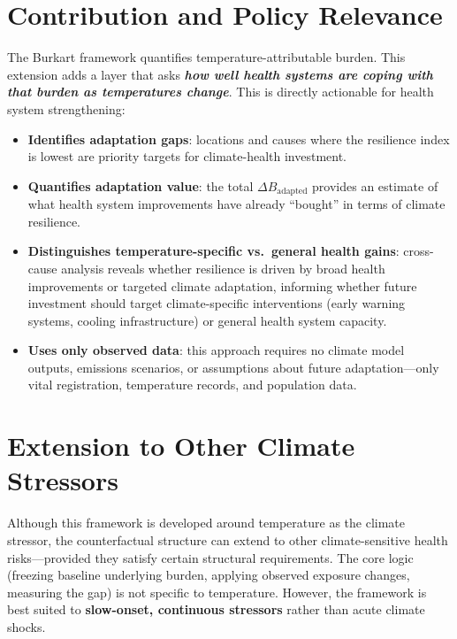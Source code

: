 \documentclass[11pt,a4paper]{article}
\begin{document}
\section{Contribution and Policy Relevance}

The Burkart framework quantifies temperature-attributable burden. This extension adds a layer that asks \textbf{\emph{how well health systems are coping with that burden as temperatures change}}. This is directly actionable for health system strengthening:

\begin{itemize}[nosep]
  \item \textbf{Identifies adaptation gaps}: locations and causes where the resilience index is lowest are priority targets for climate-health investment.
  \item \textbf{Quantifies adaptation value}: the total $\Delta B_{\text{adapted}}$ provides an estimate of what health system improvements have already ``bought'' in terms of climate resilience.
  \item \textbf{Distinguishes temperature-specific vs.\ general health gains}: cross-cause analysis reveals whether resilience is driven by broad health improvements or targeted climate adaptation, informing whether future investment should target climate-specific interventions (early warning systems, cooling infrastructure) or general health system capacity.
  \item \textbf{Uses only observed data}: this approach requires no climate model outputs, emissions scenarios, or assumptions about future adaptation---only vital registration, temperature records, and population data.
\end{itemize}

\section{Extension to Other Climate Stressors}

Although this framework is developed around temperature as the climate stressor, the counterfactual structure can extend to other climate-sensitive health risks---provided they satisfy certain structural requirements. The core logic (freezing baseline underlying burden, applying observed exposure changes, measuring the gap) is not specific to temperature. However, the framework is best suited to \textbf{slow-onset, continuous stressors} rather than acute climate shocks.
\end{document}
